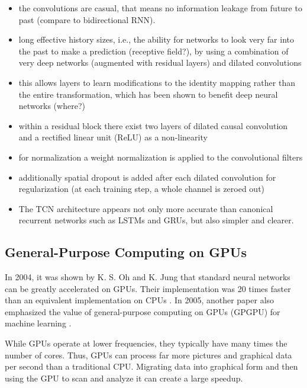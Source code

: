 \documentclass{scrartcl}
\begin{document}
\begin{itemize}
\item the convolutions are casual, that means no information leakage from future to past (compare to bidirectional RNN).
\item long effective history sizes, i.e., the ability for networks to look very far into the past to make a prediction (receptive field?), by using a combination of very deep networks (augmented with residual layers) and dilated convolutions 
\item this allows layers to learn modifications to the identity mapping rather than the entire transformation, which has been shown to benefit deep neural networks (where?)
\item within a residual block there exist two layers of dilated causal convolution and a rectified linear unit (ReLU) \cite{Nair2010} as a non-linearity
\item for normalization a weight normalization \cite{Salimans2016} is applied to the convolutional filters 
\item additionally spatial dropout \cite{Srivastava2014} is added after each dilated convolution for regularization (at each training step, a whole channel is zeroed out)
\item The TCN architecture appears not only more accurate than canonical recurrent networks such as LSTMs and GRUs, but also simpler and clearer.
\end{itemize}






\subsection{General-Purpose Computing on GPUs} 

In 2004, it was shown by K. S. Oh and K. Jung that standard neural networks can be greatly accelerated on GPUs. Their implementation was 20 times faster than an equivalent implementation on CPUs \cite{Oh2004}. In 2005, another paper also emphasized the value of general-purpose computing on GPUs (GPGPU) for machine learning \cite{Steinkraus2005}.

While GPUs operate at lower frequencies, they typically have many times the number of cores. Thus, GPUs can process far more pictures and graphical data per second than a traditional CPU. Migrating data into graphical form and then using the GPU to scan and analyze it can create a large speedup.
\end{document}
